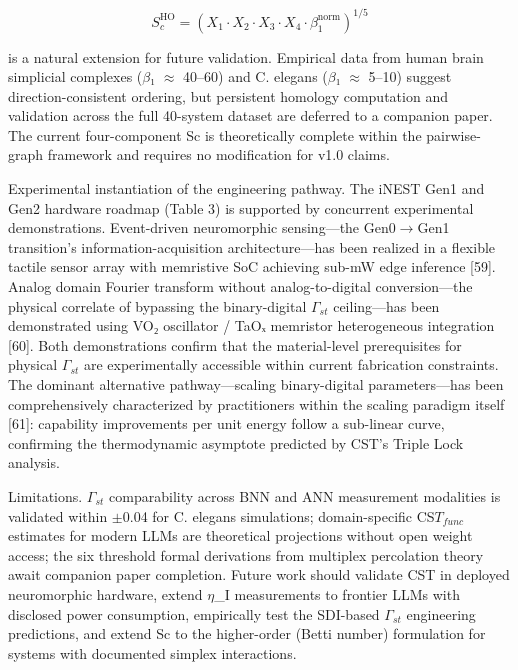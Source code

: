 \documentclass[a4paper,12pt]{article}
\begin{document}
\begin{equation}

S_c^{\text{HO}} = (X_1 \cdot X_2 \cdot X_3 \cdot X_4 \cdot \beta_1^{\text{norm}})^{1/5}

\end{equation}


is a natural extension for future validation. Empirical data from human brain simplicial complexes ($\beta$₁ $\approx$ 40--60) and C. elegans ($\beta$₁ $\approx$ 5--10) suggest direction-consistent ordering, but persistent homology computation and validation across the full 40-system dataset are deferred to a companion paper. The current four-component Sc is theoretically complete within the pairwise-graph framework and requires no modification for v1.0 claims.


Experimental instantiation of the engineering pathway.
The iNEST Gen1 and Gen2 hardware roadmap (Table 3) is supported by concurrent experimental demonstrations.
Event-driven neuromorphic sensing---the Gen0$\rightarrow$Gen1 transition's information-acquisition architecture---has been realized in a flexible tactile sensor array with memristive SoC achieving sub-mW edge inference [59].
Analog domain Fourier transform without analog-to-digital conversion---the physical correlate of bypassing the binary-digital $\Gamma_{st}$ ceiling---has been demonstrated using VO₂ oscillator / TaOₓ memristor heterogeneous integration [60].
Both demonstrations confirm that the material-level prerequisites for physical $\Gamma_{st}$ are experimentally accessible within current fabrication constraints.
The dominant alternative pathway---scaling binary-digital parameters---has been comprehensively characterized by practitioners within the scaling paradigm itself [61]: capability improvements per unit energy follow a sub-linear curve, confirming the thermodynamic asymptote predicted by CST's Triple Lock analysis.


Limitations. $\Gamma_{st}$ comparability across BNN and ANN measurement modalities is validated within $\pm$0.04 for C. elegans simulations; domain-specific CS$T_{func}$ estimates for modern LLMs are theoretical projections without open weight access; the six threshold formal derivations from multiplex percolation theory await companion paper completion.
Future work should validate CST in deployed neuromorphic hardware, extend $\eta$_I measurements to frontier LLMs with disclosed power consumption, empirically test the SDI-based $\Gamma_{st}$ engineering predictions, and extend Sc to the higher-order (Betti number) formulation for systems with documented simplex interactions.
\end{document}

